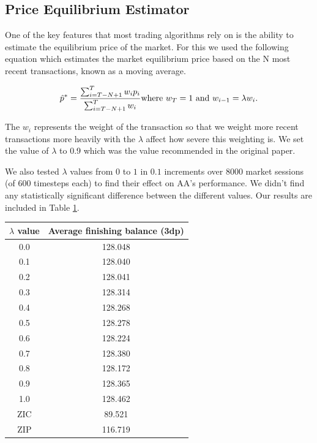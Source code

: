 \documentclass[preprint]{acm_proc_article-sp} %
\begin{document}
\subsection{Price Equilibrium Estimator}
One of the key features that most trading algorithms rely on is the ability to
estimate the equilibrium price of the market. For this we used the following
equation which estimates the market equilibrium price based on the N most
recent transactions, known as a moving average.

\begin{equation}
    \label{eqn:equilibrium_estimator}
    \hat p^* = \frac{\sum^T_{i=T-N+1}w_ip_i}{\sum^T_{i=T-N+1}w_i}\\
    \text{where $w_T = 1$ and $w_{i-1} = \lambda w_i$.}
\end{equation}

The $w_i$ represents the weight of the transaction so that we weight more
recent transactions more heavily with the $\lambda$ affect how severe this
weighting is. We set the value of $\lambda$ to 0.9 which was the value
recommended in the original paper\cite[p.~100]{AA_thesis}.

We also tested $\lambda$ values from $0$ to $1$ in $0.1$ increments over 8000 market sessions (of 
600 timesteps each) to find their effect on AA's performance. We didn't find any statistically 
significant difference between the different values. Our results are included in Table \ref{tbl:lambda_results}.
\begin{table}[h]
  \centering
  \label{tbl:lambda_results}
  \begin{tabular}{ | c | c | }
    \hline
    \textbf{$\lambda$ value} & \textbf{Average finishing balance (3dp)} \\
    \hline
    0.0 & 128.048 \\
    0.1 & 128.040 \\
    0.2 & 128.041 \\
    0.3 & 128.314 \\
    0.4 & 128.268 \\
    0.5 & 128.278 \\
    0.6 & 128.224 \\
    0.7 & 128.380 \\
    0.8 & 128.172 \\
    0.9 & 128.365 \\
    1.0 & 128.462 \\
    \hline \hline
    ZIC & 89.521 \\
    ZIP & 116.719 \\
    \hline
  \end{tabular}
\end{table}\\
\end{document}
